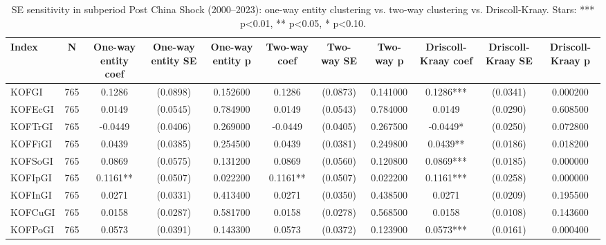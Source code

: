 \begin{table}[htbp]
\caption{SE sensitivity in subperiod Post China Shock (2000--2023): one-way entity clustering vs. two-way clustering vs. Driscoll-Kraay. Stars: *** p<0.01, ** p<0.05, * p<0.10.}
\label{tab:se_comparison_post_china_shock}
\begin{tabular}{lcccccccccc}
\toprule
Index & N & One-way entity coef & One-way entity SE & One-way entity p & Two-way coef & Two-way SE & Two-way p & Driscoll-Kraay coef & Driscoll-Kraay SE & Driscoll-Kraay p \\
\midrule
KOFGI & 765 & 0.1286 & (0.0898) & 0.152600 & 0.1286 & (0.0873) & 0.141000 & 0.1286*** & (0.0341) & 0.000200 \\
KOFEcGI & 765 & 0.0149 & (0.0545) & 0.784900 & 0.0149 & (0.0543) & 0.784000 & 0.0149 & (0.0290) & 0.608500 \\
KOFTrGI & 765 & -0.0449 & (0.0406) & 0.269000 & -0.0449 & (0.0405) & 0.267500 & -0.0449* & (0.0250) & 0.072800 \\
KOFFiGI & 765 & 0.0439 & (0.0385) & 0.254500 & 0.0439 & (0.0381) & 0.249800 & 0.0439** & (0.0186) & 0.018200 \\
KOFSoGI & 765 & 0.0869 & (0.0575) & 0.131200 & 0.0869 & (0.0560) & 0.120800 & 0.0869*** & (0.0185) & 0.000000 \\
KOFIpGI & 765 & 0.1161** & (0.0507) & 0.022200 & 0.1161** & (0.0507) & 0.022200 & 0.1161*** & (0.0258) & 0.000000 \\
KOFInGI & 765 & 0.0271 & (0.0331) & 0.413400 & 0.0271 & (0.0350) & 0.438500 & 0.0271 & (0.0209) & 0.195500 \\
KOFCuGI & 765 & 0.0158 & (0.0287) & 0.581700 & 0.0158 & (0.0278) & 0.568500 & 0.0158 & (0.0108) & 0.143600 \\
KOFPoGI & 765 & 0.0573 & (0.0391) & 0.143300 & 0.0573 & (0.0372) & 0.123900 & 0.0573*** & (0.0161) & 0.000400 \\
\bottomrule
\end{tabular}
\end{table}
